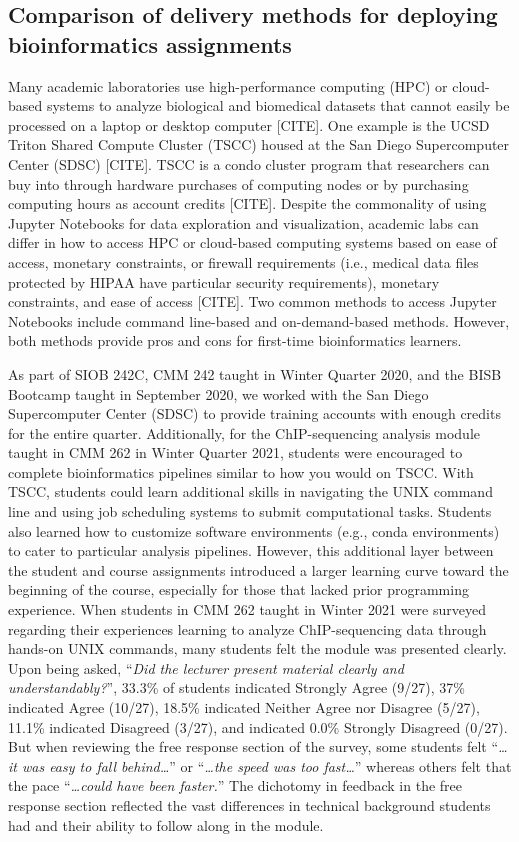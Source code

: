 \subsection{Comparison of delivery methods for deploying bioinformatics assignments}

Many academic laboratories use high-performance computing (HPC) or cloud-based systems to analyze biological and biomedical datasets that cannot easily be processed on a laptop or desktop computer [CITE]. One example is the UCSD Triton Shared Compute Cluster (TSCC) housed at the San Diego Supercomputer Center (SDSC) [CITE]. TSCC is a condo cluster program that researchers can buy into through hardware purchases of computing nodes or by purchasing computing hours as account credits [CITE]. Despite the commonality of using Jupyter Notebooks for data exploration and visualization, academic labs can differ in how to access HPC or cloud-based computing systems based on ease of access, monetary constraints, or firewall requirements (i.e., medical data files protected by HIPAA have particular security requirements), monetary constraints, and ease of access [CITE]. Two common methods to access Jupyter Notebooks include command line-based and on-demand-based methods. However, both methods provide pros and cons for first-time bioinformatics learners. 

As part of SIOB 242C, CMM 242 taught in Winter Quarter 2020, and the BISB Bootcamp taught in September 2020, we worked with the San Diego Supercomputer Center (SDSC) to provide training accounts with enough credits for the entire quarter. Additionally, for the ChIP-sequencing analysis module taught in CMM 262 in Winter Quarter 2021, students were encouraged to complete bioinformatics pipelines similar to how you would on TSCC. With TSCC, students could learn additional skills in navigating the UNIX command line and using job scheduling systems to submit computational tasks. Students also learned how to customize software environments (e.g., conda environments) to cater to particular analysis pipelines. However, this additional layer between the student and course assignments introduced a larger learning curve toward the beginning of the course, especially for those that lacked prior programming experience. When students in CMM 262 taught in Winter 2021 were surveyed regarding their experiences learning to analyze ChIP-sequencing data through hands-on UNIX commands, many students felt the module was presented clearly. Upon being asked, “\textit{Did the lecturer present material clearly and understandably?}”, 33.3\% of students indicated Strongly Agree (9/27), 37\% indicated Agree (10/27), 18.5\% indicated Neither Agree nor Disagree (5/27), 11.1\% indicated Disagreed (3/27), and indicated 0.0\% Strongly Disagreed (0/27). But when reviewing the free response section of the survey, some students felt “\textit{…it was easy to fall behind…}” or “\textit{…the speed was too fast…}” whereas others felt that the pace “\textit{…could have been faster.}” The dichotomy in feedback in the free response section reflected the vast differences in technical background students had and their ability to follow along in the module. 

